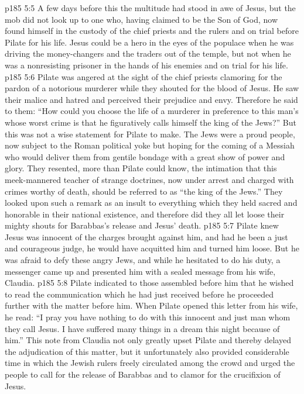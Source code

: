 \vs p185 5:5 A few days before this the multitude had stood in awe of Jesus, but the mob did not look up to one who, having claimed to be the Son of God, now found himself in the custody of the chief priests and the rulers and on trial before Pilate for his life. Jesus could be a hero in the eyes of the populace when he was driving the money\hyp{}changers and the traders out of the temple, but not when he was a nonresisting prisoner in the hands of his enemies and on trial for his life.
\vs p185 5:6 Pilate was angered at the sight of the chief priests clamoring for the pardon of a notorious murderer while they shouted for the blood of Jesus. He saw their malice and hatred and perceived their prejudice and envy. Therefore he said to them: “How could you choose the life of a murderer in preference to this man’s whose worst crime is that he figuratively calls himself the king of the Jews?” But this was not a wise statement for Pilate to make. The Jews were a proud people, now subject to the Roman political yoke but hoping for the coming of a Messiah who would deliver them from gentile bondage with a great show of power and glory. They resented, more than Pilate could know, the intimation that this meek\hyp{}mannered teacher of strange doctrines, now under arrest and charged with crimes worthy of death, should be referred to as “the king of the Jews.” They looked upon such a remark as an insult to everything which they held sacred and honorable in their national existence, and therefore did they all let loose their mighty shouts for Barabbas’s release and Jesus’ death.
\vs p185 5:7 Pilate knew Jesus was innocent of the charges brought against him, and had he been a just and courageous judge, he would have acquitted him and turned him loose. But he was afraid to defy these angry Jews, and while he hesitated to do his duty, a messenger came up and presented him with a sealed message from his wife, Claudia.
\vs p185 5:8 Pilate indicated to those assembled before him that he wished to read the communication which he had just received before he proceeded further with the matter before him. When Pilate opened this letter from his wife, he read: “I pray you have nothing to do with this innocent and just man whom they call Jesus. I have suffered many things in a dream this night because of him.” This note from Claudia not only greatly upset Pilate and thereby delayed the adjudication of this matter, but it unfortunately also provided considerable time in which the Jewish rulers freely circulated among the crowd and urged the people to call for the release of Barabbas and to clamor for the crucifixion of Jesus.
